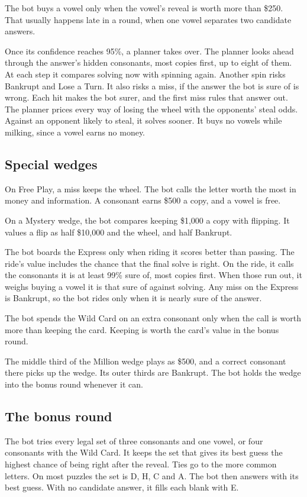 The bot buys a vowel only when the vowel's reveal is worth more than \$250. That usually happens late in a round, when one vowel separates two candidate answers.

Once its confidence reaches 95\%, a planner takes over. The planner looks ahead through the answer's hidden consonants, most copies first, up to eight of them. At each step it compares solving now with spinning again. Another spin risks Bankrupt and Lose a Turn. It also risks a miss, if the answer the bot is sure of is wrong. Each hit makes the bot surer, and the first miss rules that answer out. The planner prices every way of losing the wheel with the opponents' steal odds. Against an opponent likely to steal, it solves sooner. It buys no vowels while milking, since a vowel earns no money.

\subsection{Special wedges}\label{app:bot-wedges}

On Free Play, a miss keeps the wheel. The bot calls the letter worth the most in money and information. A consonant earns \$500 a copy, and a vowel is free.

On a Mystery wedge, the bot compares keeping \$1,000 a copy with flipping. It values a flip as half \$10,000 and the wheel, and half Bankrupt.

The bot boards the Express only when riding it scores better than passing. The ride's value includes the chance that the final solve is right. On the ride, it calls the consonants it is at least 99\% sure of, most copies first. When those run out, it weighs buying a vowel it is that sure of against solving. Any miss on the Express is Bankrupt, so the bot rides only when it is nearly sure of the answer.

The bot spends the Wild Card on an extra consonant only when the call is worth more than keeping the card. Keeping is worth the card's value in the bonus round.

The middle third of the Million wedge plays as \$500, and a correct consonant there picks up the wedge. Its outer thirds are Bankrupt. The bot holds the wedge into the bonus round whenever it can.

\subsection{The bonus round}

The bot tries every legal set of three consonants and one vowel, or four consonants with the Wild Card. It keeps the set that gives its best guess the highest chance of being right after the reveal. Ties go to the more common letters. On most puzzles the set is D, H, C and A. The bot then answers with its best guess. With no candidate answer, it fills each blank with E.

